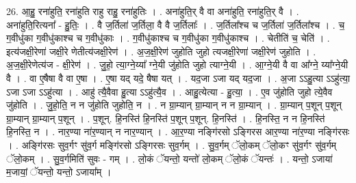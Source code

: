 \documentclass[17pt]{extarticle}
\begin{document}
26. आ॒हु॒ रना॑हुति॒ रना॑हुति राहु राहु॒ रना॑हुतिः । . अना॑हुति॒र् वै वा अना॑हुति॒ रना॑हुति॒र् वै । . अना॑हुति॒रित्यना᳚ - हु॒तिः॒ । . वै ज॒र्तिला॑ ज॒र्तिला॒ वै वै ज॒र्तिलाः᳚ । . ज॒र्तिला᳚श्च च ज॒र्तिला॑ ज॒र्तिला᳚श्च । . च॒ ग॒वीधु॑का ग॒वीधु॑काश्च च ग॒वीधु॑काः । . ग॒वीधु॑काश्च च ग॒वीधु॑का ग॒वीधु॑काश्च । . चेतीति॑ च॒ चेति॑ । . इत्य॑जक्षी॒रेणा॑ जक्षी॒रे णेतीत्य॑जक्षी॒रेण॑ । . अ॒ज॒क्षी॒रेण॑ जुहोति जुहो त्यजक्षी॒रेणा॑ जक्षी॒रेण॑ जुहोति । . अ॒ज॒क्षी॒रेणेत्य॑ज - क्षी॒रेण॑ । . जु॒हो॒ त्या॒ग्ने॒य्या᳚ ग्ने॒यी जु॑होति जुहो त्याग्ने॒यी । . आ॒ग्ने॒यी वै वा आ᳚ग्ने॒ य्या᳚ग्ने॒यी वै । . वा ए॒षैषा वै वा ए॒षा । . ए॒षा यद् यदे॒ षैषा यत् । . यद॒जा ऽजा यद् यद॒जा । . अ॒जा ऽऽहु॒त्या ऽऽहु॑त्या॒ ऽजा ऽजा ऽऽहु॑त्या । . आहु॑ त्यै॒वैवा हु॒त्या ऽऽहु॑त्यै॒व । . आहु॒त्येत्या - हु॒त्या॒ । . ए॒व जु॑होति जुहो त्ये॒वैव जु॑होति । . जु॒हो॒ति॒ न न जु॑होति जुहोति॒ न । . न ग्रा॒म्यान् ग्रा॒म्यान् न न ग्रा॒म्यान् । . ग्रा॒म्यान् प॒शून् प॒शून् ग्रा॒म्यान् ग्रा॒म्यान् प॒शून् । . प॒शून्. हि॒नस्ति॑ हि॒नस्ति॑ प॒शून् प॒शून्. हि॒नस्ति॑ । . हि॒नस्ति॒ न न हि॒नस्ति॑ हि॒नस्ति॒ न । . नार॒ण्या ना॑र॒ण्यान् न नार॒ण्यान् । . आ॒र॒ण्या नङ्गि॑रसो ऽङ्गिरस आर॒ण्या ना॑र॒ण्या नङ्गि॑रसः । . अङ्गि॑रसः सुव॒र्गꣳ सु॑व॒र्ग मङ्गि॑रसो ऽङ्गिरसः सुव॒र्गम् । . सु॒व॒र्गम् ॅलो॒कम् ॅलो॒कꣳ सु॑व॒र्गꣳ सु॑व॒र्गम् ॅलो॒कम् । . सु॒व॒र्गमिति॑ सुवः - गम् । . लो॒कं ॅयन्तो॒ यन्तो॑ लो॒कम् ॅलो॒कं ॅयन्तः॑ । . यन्तो॒ ऽजाया॑ म॒जायां॒ ॅयन्तो॒ यन्तो॒ ऽजाया᳚म् । \newline
\end{document}
